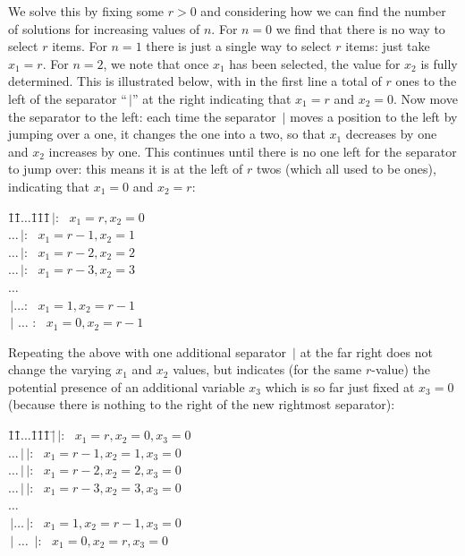 \documentclass[titlepage]{article}
\theoremstyle{definition}
\numberwithin{equation}{subsection}
\numberwithin{remark}{subsection}
\begin{document}
We solve this by fixing some $r>0$ and considering how we can find the number of solutions for increasing values of $n$. For $n=0$ we find that there is no way to select $r$ items. For $n=1$ there is just a single way to select $r$ items: just take $x_1=r$.
For $n=2$, we note that once $x_1$ has been selected, the value for $x_2$ is fully determined. This is illustrated below, with in the first line a total of $r$ ones to the left of the separator ``$\,|$'' at the right indicating that $x_1=r$ and $x_2=0$. Now move the separator to the left: each time the separator $\,|$ moves a position to the left by jumping over a one, it changes the one into a two, so that $x_1$ decreases by one and $x_2$ increases by one. This continues until there is no one left for the separator to jump over: this means it is at the left of $r$ twos (which all used to be ones), indicating that $x_1=0$ and $x_2=r$:
{\small{\begin{tabbing}
\hspace*{50pt}\=1\=1\=$\ldots$\=1\=1\=1\=$\,|$: $\,\,\,x_1=r, x_2=0$\\
\>$\ldots$\>$\,|$: $\,\,\,x_1=r-1, x_2=1$\\
\>$\ldots$\>$\,|$: $\,\,\,x_1=r-2, x_2=2$\\
\>$\ldots$\>$\,|$: $\,\,\,x_1=r-3, x_2=3$\\
\>\>\>$\ldots$\\
\>$\,|$\>$\ldots$: $\,\,\,x_1=1, x_2=r-1$\\
\>$\,|$    \>$\ldots$        : $\,\,\,x_1=0, x_2=r-1$
\end{tabbing}}}
\par\noindent
Repeating the above with one additional separator $\,|$ at the far right does not change the varying $x_1$ and $x_2$ values, but indicates (for the same $r$-value) the potential presence of an additional variable $x_3$ which is so far just fixed at $x_3=0$ (because there is nothing to the right of the new rightmost separator):
{\small{\begin{tabbing}
\hspace*{50pt}\=1\=1\=$\ldots$\=1\=1\=1\=$\,|$\=$\,|$: $\,\,\,x_1=r, x_2=0, x_3=0$\\
\>$\ldots$\>$\,|$\>$\,|$: $\,\,\,x_1=r-1, x_2=1, x_3=0$\\
\>$\ldots$\>$\,|$\>$\,|$: $\,\,\,x_1=r-2, x_2=2, x_3=0$\\
\>$\ldots$\>$\,|$\>$\,|$: $\,\,\,x_1=r-3, x_2=3, x_3=0$\\
\>\>\>$\ldots$\\
\>$\,|$\>$\ldots$\>$\,|$: $\,\,\,x_1=1, x_2=r-1, x_3=0$\\
\>$\,|$    \>$\ldots$        \>$\,|$: $\,\,\,x_1=0, x_2=r, x_3=0$
\end{tabbing}}}
\end{document}
